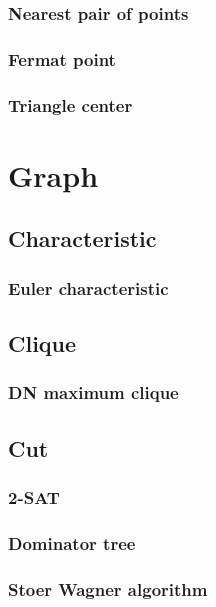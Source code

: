 \documentclass[titlepage,a4paper,10pt]{article}
\begin{document}
\begin{multicols}{2}
\begin{spacing}{0.8}
{				\subsubsection{Nearest pair of points}
					
				\subsubsection{Fermat point}
					
				\subsubsection{Triangle center}
					
		\section{Graph}
			
			\subsection{Characteristic}
				\subsubsection{Euler characteristic}
					
			\subsection{Clique}
				\subsubsection{DN maximum clique}
					
			\subsection{Cut}
				\subsubsection{2-SAT}
					
				\subsubsection{Dominator tree}
					
				\subsubsection{Stoer Wagner algorithm}
					
}
\end{spacing}
\end{multicols}
\end{document}
